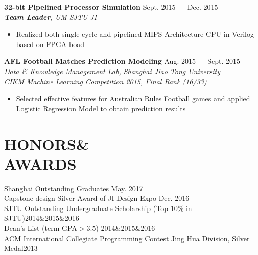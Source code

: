 \documentclass[margin,line,10pt]{res}
\begin{document}
\begin{resume}
{
\small
{\bf 32-bit Pipelined Processor Simulation} \hfill Sept. 2015 --- Dec. 2015\\
{\it \textbf{Team Leader}, UM-SJTU JI}
}
\begin{itemize}
\setlength{\itemsep}{0pt}
\setlength{\parskip}{0pt}
\setlength{\parsep}{0pt}
\item {\small Realized both single-cycle and pipelined MIPS-Architecture CPU in Verilog based on FPGA boad}
\end{itemize}
\vspace{-.1 in}
{
\small
{\bf AFL Football Matches Prediction Modeling} \hfill Aug. 2015 --- Sept. 2015\\
{\it Data \& Knowledge Management Lab, Shanghai Jiao Tong University \\ CIKM Machine Learning Competition 2015, Final Rank (16/33)}
}
\begin{itemize}
\setlength{\itemsep}{0pt}
\setlength{\parskip}{0pt}
\setlength{\parsep}{0pt}
\item {\small Selected effective features for Australian Rules Football games and applied Logistic Regression Model to obtain prediction results}
\end{itemize}

\section{HONORS\&\\AWARDS}
{
\small
Shanghai Outstanding Graduates \hfill May. 2017\\
Capstone design Silver Award of JI Design Expo \hfill Dec. 2016\\
SJTU Outstanding Undergraduate Scholarship {(Top 10\% in SJTU)}\hfill2014\&2015\&2016\\
Dean's List {(term GPA$>$3.5)} \hfill2014\&2015\&2016\\
ACM International Collegiate Programming Contest Jing Hua Division, Silver Medal\hfill 2013\\
}



\end{resume}
\end{document}
